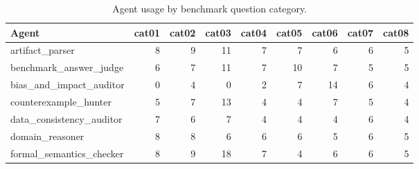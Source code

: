 \begin{table}
\caption{Agent usage by benchmark question category.}
\label{tab:agent-usage-by-category}
\begin{tabular}{lrrrrrrrr}
\hline
Agent & cat01 & cat02 & cat03 & cat04 & cat05 & cat06 & cat07 & cat08 \\
\hline
artifact\_parser & 8 & 9 & 11 & 7 & 7 & 6 & 6 & 5 \\
benchmark\_answer\_judge & 6 & 7 & 11 & 7 & 10 & 7 & 5 & 5 \\
bias\_and\_impact\_auditor & 0 & 4 & 0 & 2 & 7 & 14 & 6 & 4 \\
counterexample\_hunter & 5 & 7 & 13 & 4 & 4 & 7 & 5 & 4 \\
data\_consistency\_auditor & 7 & 6 & 7 & 4 & 4 & 4 & 6 & 4 \\
domain\_reasoner & 8 & 8 & 6 & 6 & 6 & 5 & 6 & 5 \\
formal\_semantics\_checker & 8 & 9 & 18 & 7 & 4 & 6 & 6 & 5 \\
\hline
\end{tabular}
\end{table}
